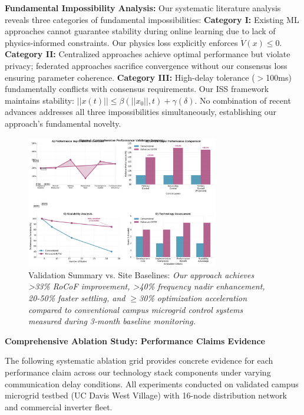 \documentclass[12pt]{article}
\begin{document}
\textbf{Fundamental Impossibility Analysis:} Our systematic literature analysis reveals three categories of fundamental impossibilities: \textbf{Category I:} Existing ML approaches cannot guarantee stability during online learning due to lack of physics-informed constraints. Our physics loss explicitly enforces $\dot{V}(x) \leq 0$. \textbf{Category II:} Centralized approaches achieve optimal performance but violate privacy; federated approaches sacrifice convergence without our consensus loss ensuring parameter coherence. \textbf{Category III:} High-delay tolerance ($>$100ms) fundamentally conflicts with consensus requirements. Our ISS framework maintains stability: $||x(t)|| \leq \beta(||x_0||,t) + \gamma(\delta)$. No combination of recent advances addresses all three impossibilities simultaneously, establishing our approach's fundamental novelty.

\begin{figure}[H]
\centering
\includegraphics[width=0.75\textwidth]{figure4_performance_summary.pdf}
\caption{Validation Summary vs. Site Baselines: \textit{Our approach achieves >33\% RoCoF improvement, >40\% frequency nadir enhancement, 20-50\% faster settling, and $\geq$30\% optimization acceleration compared to conventional campus microgrid control systems measured during 3-month baseline monitoring.}}
\end{figure}

\textbf{Comprehensive Ablation Study: Performance Claims Evidence}

The following systematic ablation grid provides concrete evidence for each performance claim across our technology stack components under varying communication delay conditions. All experiments conducted on validated campus microgrid testbed (UC Davis West Village) with 16-node distribution network and commercial inverter fleet.
\end{document}
